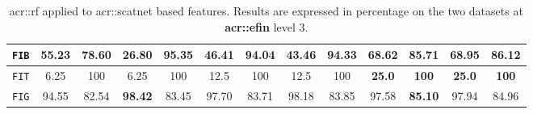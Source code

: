 \begin{sidewaystable}[htpb]
\begin{tabular}{| c | c c | c c | c c | c c | c c | c c |}
                    \hline
                    \texttt{FIB} & 55.23 & 78.60 & 26.80 & \textbf{95.35} & 46.41 & 94.04 & 43.46 & 94.33 & 68.62 & 85.71 & \textbf{68.95} & 86.12 \\
                    \hline
                    \texttt{FIT} & 6.25 & 100 & 6.25 & 100 & 12.5 & 100 & 12.5 & 100 & \textbf{25.0} & \textbf{100} & \textbf{25.0} & \textbf{100} \\
                    \hline
                    \texttt{FIG} & 94.55 & 82.54 & \textbf{98.42} & 83.45 & 97.70 & 83.71 & 98.18 & 83.85 & 97.58 & \textbf{85.10} & 97.94 & 84.96 \\
                    \hline
                \end{tabular}
                \caption{
                    \label{tab::stats_scat_rf_f3}
                    \gls{acr::rf} applied to \gls{acr::scatnet} based features.
                    Results are expressed in percentage on the two datasets at \textbf{\gls{acr::efin}} level 3.
                }
            \end{sidewaystable}
